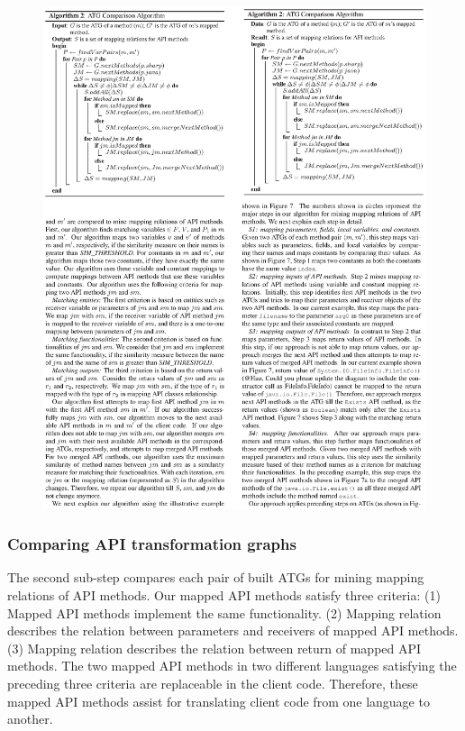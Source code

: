\begin{figure}[t]
\centering
\includegraphics[scale=1,clip]{figure/algorithm2.eps}
\vspace*{-6ex}
\end{figure}

\subsubsection{Comparing API transformation graphs}

The second sub-step compares each pair of built ATGs for mining
mapping relations of API methods. Our mapped API methods satisfy
three criteria: (1) Mapped API methods implement the same
functionality. (2) Mapping relation describes the relation between
parameters and receivers of mapped API methods. (3) Mapping relation
describes the relation between return of mapped API methods.
The two mapped API methods in two different languages satisfying the
preceding three criteria are replaceable in the client code.
Therefore, these mapped API methods assist for translating client
code from one language to another.

